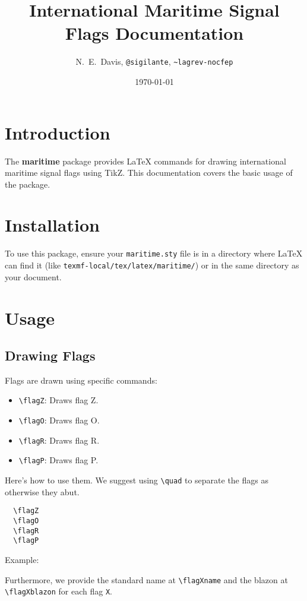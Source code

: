 \documentclass{article}
\title{International Maritime Signal Flags Documentation}
\author{N.\ E.\ Davis, \texttt{@sigilante}, \texttt{\textasciitilde lagrev-nocfep}}
\date{\today}
\begin{document}
\maketitle

\section{Introduction}

The \textbf{maritime} package provides LaTeX commands for drawing international maritime signal flags using TikZ. This documentation covers the basic usage of the package.

\section{Installation}
To use this package, ensure your \texttt{maritime.sty} file is in a directory where LaTeX can find it (like \texttt{texmf-local/tex/latex/maritime/}) or in the same directory as your document.

\section{Usage}

\subsection{Drawing Flags}
Flags are drawn using specific commands:

\begin{itemize}
    \item \verb|\flagZ|: Draws flag Z.
    \item \verb|\flagO|: Draws flag O.
    \item \verb|\flagR|: Draws flag R.
    \item \verb|\flagP|: Draws flag P.
\end{itemize}

Here's how to use them.  We suggest using \verb|\quad| to separate the flags as otherwise they abut.

\begin{verbatim}
  \flagZ
  \flagO
  \flagR
  \flagP
\end{verbatim}

Example:

\flagZ \quad \flagO \quad \flagR \quad \flagP

Furthermore, we provide the standard name at \verb|\flagXname| and the blazon at \verb|\flagXblazon| for each flag \verb|X|.
\end{document}
